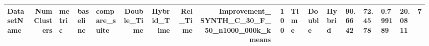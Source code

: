 \begin{tabular}{lrlllrrrrr}
\toprule
DatasetName & NumClusters & metric & baseline & compare_suite & Double_Time & Hybrid_Time & Rel_Time & Improvement_%
\midrule
SYNTH_C_30_F_50_n1000_000k_kmeans & 100 & Time & Double & Hybrid & 90.6642 & 72.4578 & 0.799189 & 20.0811 & 7 \\
\bottomrule
\end{tabular}
